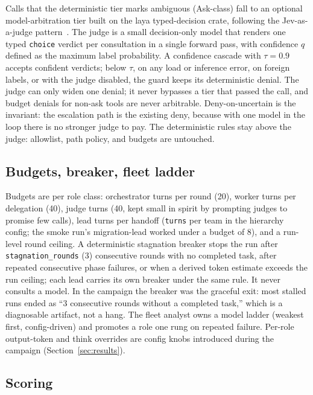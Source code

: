 \documentclass[11pt]{article}
\begin{document}
Calls that the deterministic tier marks ambiguous (Ask-class) fall to
an optional model-arbitra\-tion tier built on the laya typed-decision
crate,
following the Jev-as-a-judge pattern~\cite{li2026jevjudge}. The judge is
a small decision-only model that renders one typed \texttt{choice}
verdict per consultation in a single forward pass, with confidence $q$
defined as the maximum label probability. A confidence cascade with
$\tau = 0.9$ accepts confident verdicts; below $\tau$, on any load or
inference error, on foreign labels, or with the judge disabled, the
guard keeps its deterministic denial. The judge can only widen one
denial; it never bypasses a tier that passed the call, and budget
denials for non-ask tools are never arbitrable. Deny-on-uncertain is
the invariant: the escalation path is the existing deny, because with
one model in the loop there is no stronger judge to pay. The
deterministic rules stay above the judge: allowlist, path policy, and
budgets are untouched.

\subsection{Budgets, breaker, fleet ladder}

Budgets are per role class: orchestrator turns per round (20), worker
turns per delegation (40), judge turns (40, kept small in spirit by
prompting judges to promise few calls), lead turns per handoff
(\texttt{turns} per team in the hierarchy config; the smoke run's
migration-lead worked under a budget of 8), and a
run-level round ceiling. A deterministic stagnation breaker stops the run
after \texttt{stagnation\_rounds} (3) consecutive rounds with no completed
task, after repeated consecutive phase failures, or when a derived token
estimate exceeds the run ceiling; each lead carries its own breaker
under the same rule. It never consults a model. In the
campaign the breaker was the graceful exit: most stalled runs ended as
``3 consecutive rounds without a completed task,'' which is a diagnosable
artifact, not a hang. The fleet analyst owns a model ladder (weakest
first, config-driven) and promotes a role one rung on repeated failure.
Per-role output-token and think overrides are config knobs introduced
during the campaign (Section~\ref{sec:results}).

\subsection{Scoring}
\end{document}
